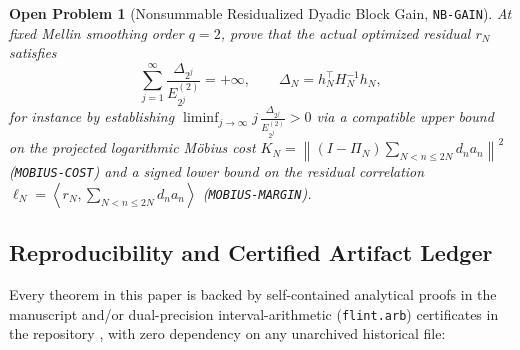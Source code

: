 \documentclass[11pt]{article}
\newtheorem{openproblem}[theorem]{Open Problem}
\theoremstyle{remark}
\newcommand{\norm}[1]{\left\lVert #1\right\rVert}
\newcommand{\ip}[2]{\left\langle #1,#2\right\rangle}
\begin{document}
\begin{openproblem}[Nonsummable Residualized Dyadic Block Gain, \texttt{NB-GAIN}]
\label{prob:nb-gain}
At fixed Mellin smoothing order $q = 2$, prove that the actual optimized residual $r_N$ satisfies
\begin{equation}
  \sum_{j=1}^\infty \frac{\Delta_{2^j}}{E_{2^j}^{(2)}} = +\infty, \qquad \Delta_N = h_N^\top H_N^{-1} h_N,
\end{equation}
for instance by establishing $\liminf_{j\to\infty} j\,\frac{\Delta_{2^j}}{E_{2^j}^{(2)}} > 0$ via a compatible upper bound on the projected logarithmic M\"obius cost $K_N = \norm{(I - \Pi_N)\sum_{N<n\le 2N} d_n a_n}^2$ (\texttt{MOBIUS-COST}) and a signed lower bound on the residual correlation $\ell_N = \ip{r_N}{\sum_{N<n\le 2N} d_n a_n}$ (\texttt{MOBIUS-MARGIN}).
\end{openproblem}

\subsection*{Reproducibility and Certified Artifact Ledger}

Every theorem in this paper is backed by self-contained analytical proofs in the manuscript and/or dual-precision interval-arithmetic (\texttt{flint.arb}) certificates in the repository , with zero dependency on any unarchived historical file:
\end{document}
